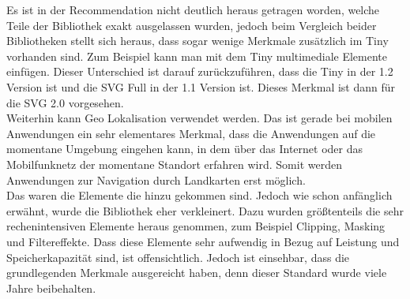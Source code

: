 Es ist in der Recommendation nicht deutlich heraus getragen worden, welche Teile der Bibliothek exakt ausgelassen wurden, jedoch beim Vergleich beider Bibliotheken stellt sich heraus, dass sogar wenige Merkmale zusätzlich im Tiny vorhanden sind. Zum Beispiel kann man mit dem Tiny multimediale Elemente einfügen. Dieser Unterschied ist darauf zurückzuführen, dass die Tiny in der 1.2 Version ist und die SVG Full in der 1.1 Version ist. Dieses Merkmal ist dann für die SVG 2.0 vorgesehen.\\
Weiterhin kann Geo Lokalisation verwendet werden. Das ist gerade bei mobilen Anwendungen ein sehr elementares Merkmal, dass die Anwendungen auf die momentane Umgebung eingehen kann, in dem über das Internet oder das Mobilfunknetz der momentane Standort erfahren wird. Somit werden Anwendungen zur Navigation durch Landkarten erst möglich.\\
Das waren die Elemente die hinzu gekommen sind. Jedoch wie schon anfänglich erwähnt, wurde die Bibliothek eher verkleinert. Dazu wurden größtenteils die sehr rechenintensiven Elemente heraus genommen, zum Beispiel Clipping, Masking und Filtereffekte. Dass diese Elemente sehr aufwendig in Bezug auf Leistung und Speicherkapazität sind, ist offensichtlich. Jedoch ist einsehbar, dass die grundlegenden Merkmale ausgereicht haben, denn dieser Standard wurde viele Jahre beibehalten.

